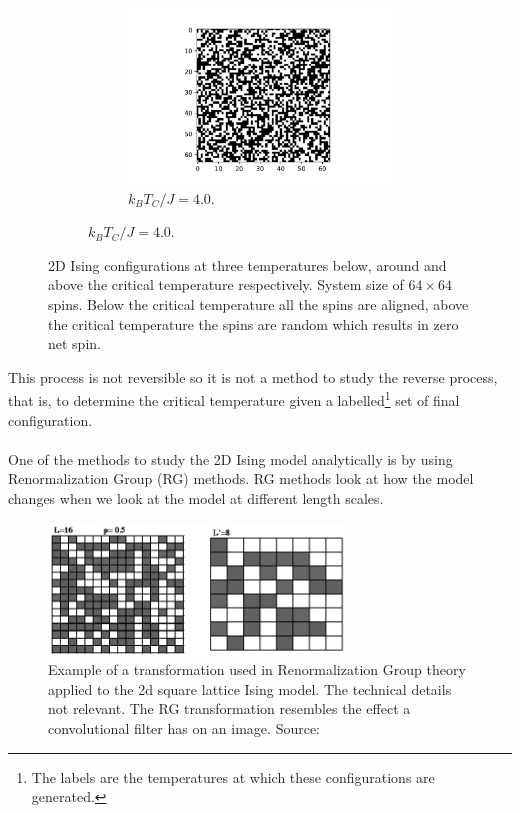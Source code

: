 \documentclass[10 pt, a4paper]{article}
\begin{document}
\begin{figure}[H]
\begin{subfigure}[b]{0.33\textwidth}
\begin{figure}[H]
\includegraphics[width=\textwidth]{lattice3}
\caption{$k_B T_C / J = 4.0$.}
\end{figure}
\end{subfigure}
\caption{2D Ising configurations at three temperatures below, around and above the critical temperature respectively. System size of $64 \times 64$ spins. Below the critical temperature all the spins are aligned, above the critical temperature the spins are random which results in zero net spin. }
\label{fig:lattices}
\end{figure}

This process is not reversible so it is not a method to study the reverse process, that is, to determine the critical temperature given a labelled\footnote{The labels are the temperatures at which these configurations are generated.} set of final configuration.
\\
\\
One of the methods to study the 2D Ising model analytically is by using Renormalization Group (RG) methods. RG methods look at how the model changes when we look at the model at different length scales.

\begin{figure}[H] 
\centering
\includegraphics[width=0.7\textwidth]{RG}
\caption{Example of a transformation used in Renormalization Group theory applied to the 2d square lattice Ising model. The technical details not relevant. The RG transformation resembles the effect a convolutional filter has on an image. Source: \cite{RG} }
\label{fig:RG}
\end{figure}
\end{document}
